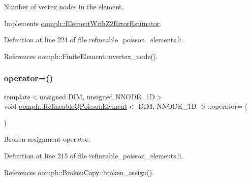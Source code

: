 Number of vertex nodes in the element. 



Implements \hyperlink{classoomph_1_1ElementWithZ2ErrorEstimator_a19495a0e77ef4ff35f15fdf7913b4077}{oomph\+::\+Element\+With\+Z2\+Error\+Estimator}.



Definition at line 224 of file refineable\+\_\+poisson\+\_\+elements.\+h.



References oomph\+::\+Finite\+Element\+::nvertex\+\_\+node().

\mbox{\label{classoomph_1_1RefineableQPoissonElement_a34c50854e8a2f3b198c399375d410f80}} 
\subsubsection{\texorpdfstring{operator=()}{operator=()}}
{\footnotesize\ttfamily template$<$unsigned D\+IM, unsigned N\+N\+O\+D\+E\+\_\+1D$>$ \\
void \hyperlink{classoomph_1_1RefineableQPoissonElement}{oomph\+::\+Refineable\+Q\+Poisson\+Element}$<$ D\+IM, N\+N\+O\+D\+E\+\_\+1D $>$\+::operator= (\begin{DoxyParamCaption}\item[{const \hyperlink{classoomph_1_1RefineableQPoissonElement}{Refineable\+Q\+Poisson\+Element}$<$ D\+IM, N\+N\+O\+D\+E\+\_\+1D $>$ \&}]{ }\end{DoxyParamCaption})\hspace{0.3cm}{\ttfamily [inline]}}



Broken assignment operator. 



Definition at line 215 of file refineable\+\_\+poisson\+\_\+elements.\+h.



References oomph\+::\+Broken\+Copy\+::broken\+\_\+assign().

\mbox{\label{classoomph_1_1RefineableQPoissonElement_abb65373718eab9b04a0eb5786ae6559c}} 

